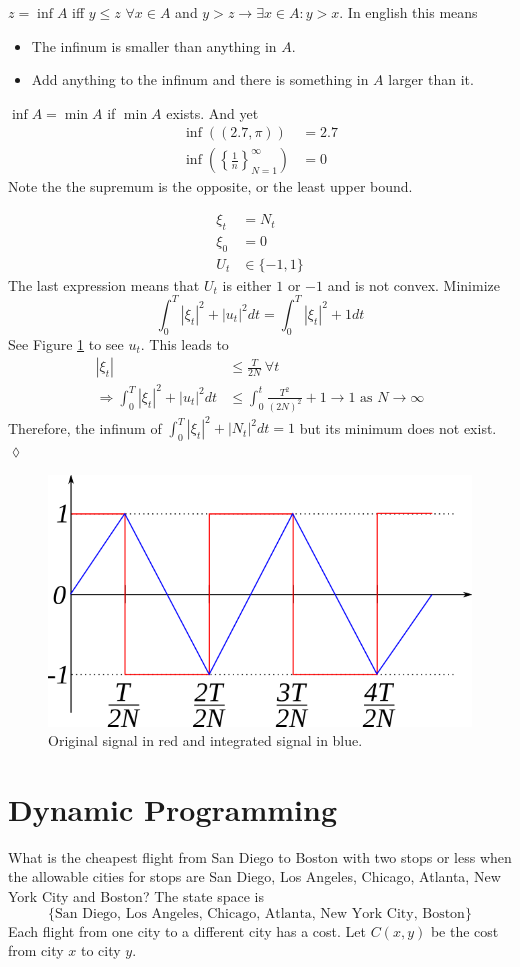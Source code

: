 $z = \inf A$ iff $y\leq z$ $\forall x\in A$ and $y>z\to\exists x\in A: y>x$. In english this means
\begin{itemize}
\item The infinum is smaller than anything in $A$.
\item Add anything to the infinum and there is something in $A$ larger than it.
\end{itemize}
$\inf A = \min A$ if $\min A$ exists. And yet
\begin{align*}
\inf((2.7,\pi)) &= 2.7 \\
\inf\left(\left\lbrace\frac{1}{n}\right\rbrace_{N=1}^\infty\right) &= 0
\end{align*}
Note the the supremum is the opposite, or the least upper bound.

\begin{example}
\begin{align*}
\xi_t &= N_t \\
\xi_0 &= 0 \\
U_t&\in\{-1,1\}
\end{align*}
The last expression means that $U_t$ is either $1$ or $-1$ and is not convex. Minimize
$$\int_0^T|\xi_t|^2 + |u_t|^2dt = \int_0^T|\xi_t|^2 + 1dt$$
See Figure \ref{fig:04signal} to see $u_t$. This leads to
\begin{align*}
|\xi_t| &\leq \frac{T}{2N} ~\forall t \\
\Rightarrow \int_0^T|\xi_t|^2+|u_t|^2dt &\leq \int_0^t\frac{T^2}{(2N)^2} + 1 \to 1 \text{ as } N\to\infty
\end{align*}
Therefore, the infinum of $\int_0^T|\xi_t|^2+|N_t|^2dt = 1$ but its minimum does not exist.
$\lozenge$
\end{example}

\begin{figure}[ht!]
	\centering
	\includegraphics[width=.4\textwidth]{images/04signal}
	\caption{Original signal in red and integrated signal in blue.}
	\label{fig:04signal}
\end{figure}

\section{Dynamic Programming}
What is the cheapest flight from San Diego to Boston with two stops or less when the allowable cities for stops are San Diego, Los Angeles, Chicago, Atlanta, New York City and Boston? The state space is
$$\{\text{San Diego, Los Angeles, Chicago, Atlanta, New York City, Boston}\}$$
Each flight from one city to a different city has a cost. Let $C(x,y)$ be the cost from city $x$ to city $y$.

